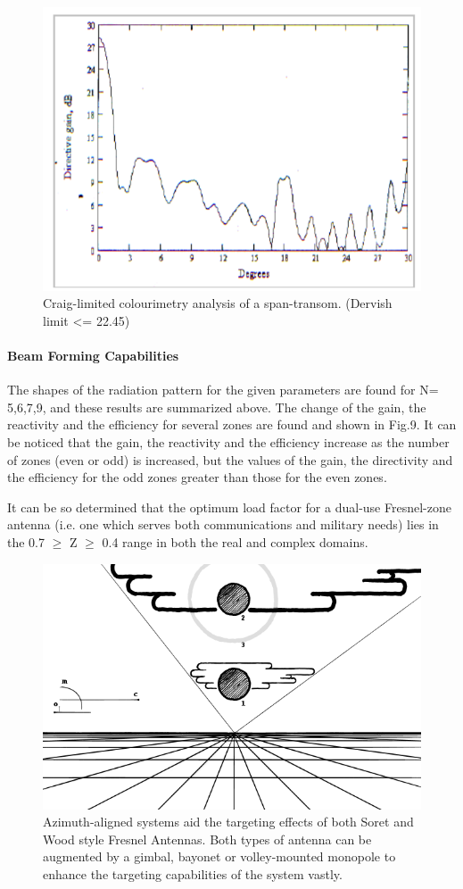\documentclass[review]{elsarticle}
\begin{document}
\begin{figure}
    \centering
    \includegraphics[width=0.5\linewidth]{Screenshot 2023-08-08 at 15.23.11.png}
    \caption{Craig-limited colourimetry analysis of a span-transom. (Dervish limit <= 22.45)}
    \label{fig:enter-label}
\end{figure}

\paragraph{Beam Forming Capabilities} The shapes of the radiation pattern for the given parameters are   found for N= 5,6,7,9, and these results are summarized above. The change of the gain, the reactivity and the efficiency for several zones are found  and shown in Fig.9.  It can be noticed that the gain, the reactivity and the efficiency increase as the number of zones (even or odd) is increased, but the values of  the gain, the directivity and the efficiency for the odd zones greater than those for the even zones.

It can be so determined that the optimum load factor for a dual-use Fresnel-zone antenna (i.e. one which serves both communications and military needs) lies in the 0.7 $\geq$ Z $\geq$ 0.4 range in both the real and complex domains. 

\begin{figure}
    \centering
    \includegraphics[width=0.5\linewidth]{Moon_size_illusion.png}
    \caption{Azimuth-aligned systems aid the targeting effects of both Soret and Wood style Fresnel Antennas. Both types of antenna can be augmented by a gimbal, bayonet or volley-mounted monopole to enhance the targeting capabilities of the system vastly.}
    \label{fig:enter-label}
\end{figure}
\end{document}
